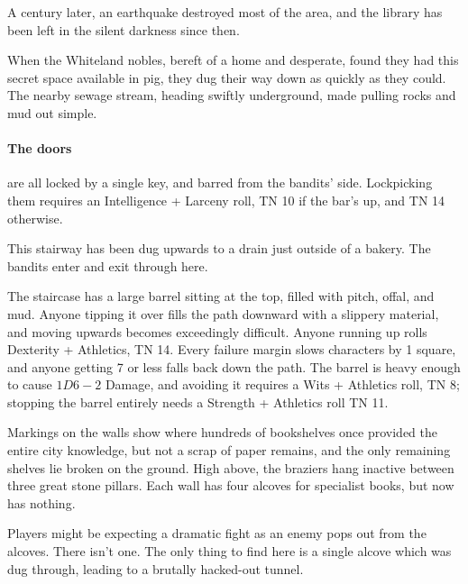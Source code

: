 A century later, an earthquake destroyed most of the area, and the library has been left in the silent darkness since then.

When the Whiteland nobles, bereft of a home and desperate, found they had this secret space available in \gls{pig}, they dug their way down as quickly as they could.  The nearby sewage stream, heading swiftly underground, made pulling rocks and mud out simple.

\paragraph{The doors} are all locked by a single key, and barred from the bandits' side.  Lockpicking them requires an Intelligence + Larceny roll, TN 10 if the bar's up, and TN 14 otherwise.


\label{bakery_exit}
This stairway has been dug upwards to a drain just outside of a bakery.  The bandits enter and exit through here.

The staircase has a large barrel sitting at the top, filled with pitch, offal, and mud.  Anyone tipping it over fills the path downward with a slippery material, and moving upwards becomes exceedingly difficult.  Anyone running up rolls Dexterity + Athletics, TN 14.  Every failure margin slows characters by 1 square, and anyone getting 7 or less falls back down the path.  The barrel is heavy enough to cause $1D6-2$ Damage, and avoiding it requires a Wits + Athletics roll, TN 8; stopping the barrel entirely needs a Strength + Athletics roll TN 11.


\label{oldlibrary}

\begin{boxtext}

	Markings on the walls show where hundreds of bookshelves once provided the entire city knowledge, but not a scrap of paper remains, and the only remaining shelves lie broken on the ground.  High above, the braziers hang inactive between three great stone pillars.  Each wall has four alcoves for specialist books, but now has nothing.

\end{boxtext}

Players might be expecting a dramatic fight as an enemy pops out from the alcoves.  There isn't one.  The only thing to find here is a single alcove which was dug through, leading to a brutally hacked-out tunnel.

